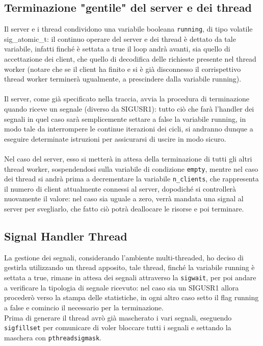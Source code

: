 \newpage

\subsection{Terminazione "gentile" del server e dei thread}
\begin{flushleft}


Il server e i thread condividono una variabile booleana \texttt{running}, di tipo volatile sig\_atomic\_t: il continuo operare del server e dei thread è dettato da tale variabile, infatti finché è settata a true il loop andrà avanti, sia quello di accettazione dei client, che quello di decodifica delle richieste presente nel thread worker (notare che se il client ha finito e si è già disconnesso il corrispettivo thread worker terminerà ugualmente, a prescindere dalla variabile running).
\\~\\
Il server, come già specificato nella traccia, avvia la procedura di terminazione quando riceve un segnale (diverso da SIGUSR1): tutto ciò che farà l'handler dei segnali in quel caso sarà semplicemente settare a false la variabile running, in modo tale da interrompere le continue iterazioni dei cicli, si andranno dunque a eseguire determinate istruzioni per assicurarsi di uscire in modo sicuro.
\\~\\
Nel caso del server, esso si metterà in attesa della terminazione di tutti gli altri thread worker, sospendendosi sulla variabile di condizione \texttt{empty}, mentre nel caso dei thread si andrà prima a decrementare la variabile \texttt{n\_clients}, che rappresenta il numero di client attualmente connessi al server, dopodiché si controllerà nuovamente il valore: nel caso sia uguale a zero, verrà mandata una signal al server per svegliarlo, che fatto ciò potrà deallocare le risorse e poi terminare.

\end{flushleft}

\subsection{Signal Handler Thread}
\begin{flushleft}

La gestione dei segnali, considerando l'ambiente multi-threaded, ho deciso di gestirla utilizzando un thread apposito, tale thread, finché la variabile running è settata a true, rimane in attesa dei segnali attraverso la \texttt{sigwait}, per poi andare a verificare la tipologia di segnale ricevuto: nel caso sia un SIGUSR1 allora procederò verso la stampa delle statistiche, in ogni altro caso setto il flag running a false e comincio il necessario per la terminazione. 
\\
Prima di generare il thread avrò già mascherato i vari segnali, eseguendo \texttt{sigfillset} per comunicare di voler bloccare tutti i segnali e settando la maschera con \texttt{pthread\textunderscore sigmask}.

\end{flushleft}

